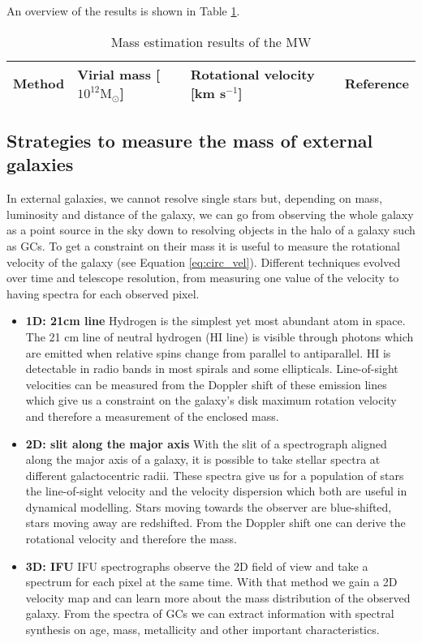 An overview of the results is shown in Table \ref{tab:MW_mass_estimations}.
\begin{table}[htbp]
\captionsetup{format=plain}
    \centering
    \begin{tabular}{@{}llll@{}}
         \toprule
         Method& Virial mass [$10^{12} \mathrm{M}_\odot$] & Rotational velocity [km s$^{-1}$]&Reference  \\
         
         \midrule

         \bottomrule 
    \end{tabular}
    \caption{Mass estimation results of the \ac{MW} }
    \label{tab:MW_mass_estimations}
\end{table}


\subsection{Strategies to measure the mass of external galaxies}\label{subsec:mass_est_ext}
In external galaxies, we cannot resolve single stars but, depending on mass, luminosity and distance of the galaxy, we can go from observing the whole galaxy as a point source in the sky down to resolving objects in the halo of a galaxy such as \acp{GC}. To get a constraint on their mass it is useful to measure the rotational velocity of the galaxy (see Equation \ref{eq:circ_vel}). Different techniques evolved over time and telescope resolution, from measuring one value of the velocity to having spectra for each observed pixel.
\begin{itemize}
    \item\textbf{1D: 21cm line} Hydrogen is the simplest yet most abundant atom in space. The 21 cm line of neutral hydrogen (HI line) is visible through photons which are emitted when relative spins change from parallel to antiparallel. HI is detectable in radio bands in most spirals and some ellipticals. Line-of-sight velocities can be measured from the Doppler shift of these emission lines which give us a constraint on the galaxy's disk maximum rotation velocity and therefore a measurement of the enclosed mass.
    \item\textbf{2D: slit along the major axis} With the slit of a spectrograph aligned along the major axis of a galaxy, it is possible to take stellar spectra at different galactocentric radii. These spectra give us for a population of stars the line-of-sight velocity and the velocity dispersion which both are useful in dynamical modelling. Stars moving towards the observer are blue-shifted, stars moving away are redshifted. From the Doppler shift one can derive the rotational velocity and therefore the mass. 
    \item \textbf{3D: \acl{IFU}} \ac{IFU} spectrographs observe the 2D field of view and take a spectrum for each pixel at the same time. With that method we gain a 2D velocity map and can learn more about the mass distribution of the observed galaxy. From the spectra of \acp{GC} we can extract information with spectral synthesis on age, mass, metallicity and other important characteristics. 
\end{itemize}

